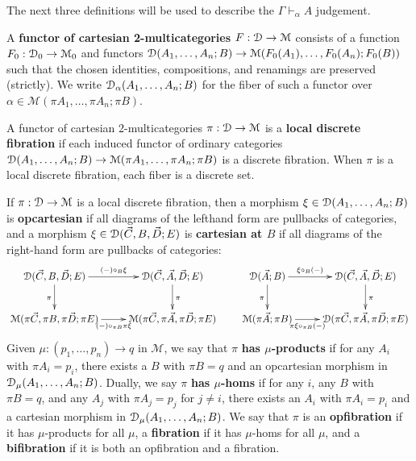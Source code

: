 \documentclass[a4paper,USenglish]{lipics-v2016}
\newcommand\seq[3]{\ensuremath{#1 \vdash_{#2} #3}}
\def\M{\mathcal{M}}
\begin{document}
The next three definitions will be used to describe the
\seq{\Gamma}{\alpha}{A} judgement.  

\begin{definition}
  A \textbf{functor of cartesian 2-multicategories} $F:\cD\to\M$
  consists of a function $F_0 : \cD_0 \to \M_0$ and functors
  $\cD(A_1,\ldots,A_n;B) \to \M(F_0(A_1),\ldots,F_0(A_n);F_0(B))$ such
  that the chosen identities, compositions, and renamings are preserved
  (strictly).  We write $\mathcal{D}_\alpha(A_1,\dots,A_n;B)$ for the fiber of
  such a functor over $\alpha \in \M(\pi A_1,\dots,\pi A_n;\pi B)$.
\end{definition}

\begin{definition}
  A functor of cartesian 2-multicategories $\pi:\cD\to\M$ is a
  \textbf{local discrete fibration} if each induced functor of ordinary
  categories $\cD(A_1,\dots,A_n;B)\to\M(\pi A_1,\dots,\pi A_n;\pi B)$ is
  a discrete fibration.  When $\pi$ is a local discrete fibration, each
  fiber is a discrete set.
\end{definition}

\begin{definition}
  If $\pi:\cD\to\M$ is a local discrete fibration, then a morphism
  $\xi\in\mathcal{D}(A_1,\dots,A_n;B)$ is \textbf{opcartesian} if all diagrams
  of the lefthand form are pullbacks of categories, and a morphism
  $\xi\in\mathcal{D}(\vec C,B,\vec D;E)$ is \textbf{cartesian at $B$} if all
  diagrams of the right-hand form are pullbacks of categories: 
  \[ \xymatrix{
    \cD(\vec C,B,\vec D;E) \ar[r]^-{(-)\circ_B \xi} \ar[d]_\pi &
    \cD(\vec C,\vec A,\vec D;E) \ar[d]^\pi \\
    \M(\pi\vec C,\pi B, \pi\vec D; \pi E) \ar[r]_-{(-)\circ_{\pi B} \pi\xi} &
    \M(\pi\vec C,\pi\vec A,\pi\vec D;\pi E)
  }
  \qquad
  \xymatrix{
    \cD(\vec A;B) \ar[r]^-{\xi\circ_B (-)} \ar[d]_\pi &
    \cD(\vec C,\vec A,\vec D;E) \ar[d]^\pi \\
    \M(\pi\vec A;\pi B) \ar[r]_-{\pi\xi\circ_{\pi B} (-)} &
    \cD(\pi\vec C,\pi\vec A,\pi\vec D;\pi E)}
  \]
  Given $\mu:(p_1,\dots,p_n) \to q$ in $\M$, we say that $\pi$ \textbf{has $\mu$-products} if for any $A_i$ with $\pi A_i = p_i$, there exists a $B$ with $\pi B = q$ and an opcartesian morphism in $\mathcal{D}_\mu(A_1,\dots,A_n;B)$.
  Dually, we say $\pi$ \textbf{has $\mu$-homs} if for any $i$, any $B$ with $\pi B = q$, and any $A_j$ with $\pi A_j = p_j$ for $j\neq i$, there exists an $A_i$ with $\pi A_i = p_i$ and a cartesian morphism in $\mathcal{D}_\mu(A_1,\dots,A_n;B)$.
  We say that $\pi$ is an \textbf{opfibration} if it has $\mu$-products for all $\mu$, a \textbf{fibration} if it has $\mu$-homs for all $\mu$, and a \textbf{bifibration} if it is both an opfibration and a fibration.
\end{definition}
\end{document}
